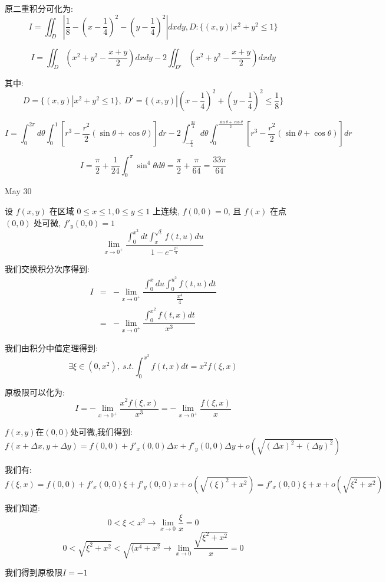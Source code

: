 \begin{solution}
	
	原二重积分可化为: 
	$$I=\iint_{D}|\dfrac{1}{8}-(x-\dfrac{1}{4})^2-(y-\dfrac{1}{4})^2|dxdy,D:\{(x,y)|x^2+y^2\leq 1\}$$
	
	$$I=\iint_{D}(x^2+y^2-\dfrac{x+y}{2})dxdy-2\iint_{D'}(x^2+y^2-\dfrac{x+y}{2})dxdy$$
	
	其中: $$D=\{(x,y)|x^2+y^2\leq 1\},\ D'=\{(x,y)|(x-\frac{1}{4})^2+(y-\frac{1}{4})^2\leq \frac{1}{8}\}$$
	
	$$I=\int_{0}^{2\pi}d\theta\int_{0}^{1}[r^3-\frac{r^2}{2}(\sin\theta+\cos\theta)]dr-2\int_{-\frac{\pi}{4}}^{\frac{3\pi}{4}}d\theta\int_{0}^{\frac{\sin\theta+\cos\theta}{2}}[r^3-\frac{r^2}{2}(\sin\theta+\cos\theta)]dr$$
	
	$$I=\frac{\pi}{2}+\frac{1}{24}\int_{0}^{\pi}\sin^4\theta d\theta=\frac{\pi}{2}+\frac{\pi}{64}=\frac{33\pi}{64}$$
\end{solution}


\textcolor{purplea}{May 30}

\begin{example}[][Exam: 31.4.17]
	设 $f(x,y)$ 在区域 $0\leq x\leq 1,0\leq y\leq 1$ 上连续, $f(0,0)=0$, 且 $f(x)$ 在点 $(0,0)$ 处可微, $f'_{y}(0,0)=1$
	$$\lim\limits_{x\to 0^{+}}\dfrac{\int_{0}^{x^2}dt\int_{x}^{\sqrt{t}}f(t,u)du}{1-e^{-\frac{x^4}{4}}}$$
\end{example}

\begin{solution}
	
	我们交换积分次序得到: 
	\begin{eqnarray*}
		I&=&-\lim\limits_{x\to 0^{+}}\dfrac{\int_{0}^{x}du\int_{0}^{u^2}f(t,u)dt}{\frac{x^4}{4}}\\
		&=&-\lim\limits_{x\to 0^{+}}\dfrac{\int_{0}^{x^2}f(t,x)dt}{x^3}
	\end{eqnarray*}
	
	我们由积分中值定理得到: 
	$$\exists \xi\in(0,x^2),\ s.t. \int_{0}^{x^2}f(t,x)dt=x^2f(\xi,x)$$
	
	原极限可以化为: 
	$$I=-\lim\limits_{x\to 0^{+}}\dfrac{x^2f(\xi,x)}{x^3}=-\lim\limits_{x\to 0^{+}}\dfrac{f(\xi,x)}{x}$$
	
	$f(x,y)$在$(0,0)$处可微,我们得到: 
	$$f(x+\Delta x,y+\Delta y)=f(0,0)+f'_{x}(0,0)\Delta x+f'_{y}(0,0)\Delta y+o(\sqrt{(\Delta x)^2+(\Delta y)^2})$$
	
	我们有: 
	$$f(\xi,x)=f(0,0)+f'_{x}(0,0)\xi+f'_{y}(0,0)x+o(\sqrt{(\xi)^2+x^2})=f'_{x}(0,0)\xi+x+o(\sqrt{\xi^2+x^2})$$
	
	我们知道: 
	$$0<\xi<x^2\to \lim\limits_{x\to 0}\dfrac{\xi}{x}=0$$
	$$0<\sqrt{\xi^2+x^2}<\sqrt{(x^4+x^2}\to \lim\limits_{x\to 0}\dfrac{\sqrt{\xi^2+x^2}}{x}=0 $$
	
	我们得到原极限$I=-1$
\end{solution}

